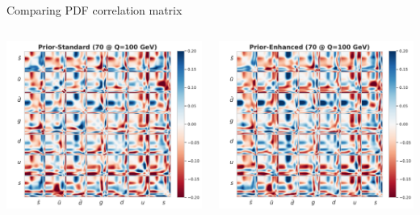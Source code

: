\begin{frame}{Comparing PDF correlation matrix}
	\begin{columns}[T] 
		\begin{column}{.5\textwidth}
			\includegraphics[width=\linewidth]{./gan_compressor/imgs/P_vs_S-N70.pdf}
		\end{column}
		\hfill
		\begin{column}{.5\textwidth}	
			\includegraphics[width=\linewidth]{./gan_compressor/imgs/P_vs_E-N70.pdf}
		\end{column}
	\end{columns}
\end{frame}


